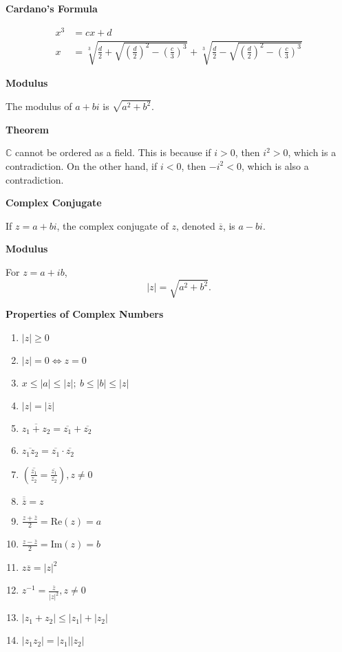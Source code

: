 \documentclass{article}
\newcommand{\inv}{^{-1}}
\newcommand{\C}{\mathbb C}
\begin{document}
\pagecolor{black}
\color{white}

\noindent\textbf{Cardano's Formula}

    \begin{align*}
        x^3 &= cx + d \\
        x &= \sqrt[3]{\frac d2 + \sqrt{\left(\frac d2\right)^2 - \left(\frac c3\right)^3}} + \sqrt[3]{\frac d2 - \sqrt{\left(\frac d2\right)^2 - \left(\frac c3\right)^3}}
    \end{align*}

\medskip\noindent\textbf{Modulus}

	The modulus of $a+bi$ is $\sqrt{a^2+b^2}$.

\medskip\noindent\textbf{Theorem}

	$\C$ cannot be ordered as a field. This is because if $i > 0$, then $i^2 > 0$, which is a contradiction. On the other hand, if $i < 0$, then $-i^2 < 0$, which is also a contradiction.

\medskip\noindent\textbf{Complex Conjugate}

    If $z = a+bi$, the complex conjugate of $z$, denoted $\overline z$, is $a-bi$.

\medskip\noindent\textbf{Modulus}

    For $z = a + ib$, $$|z| = \sqrt{a^2+b^2}.$$

\medskip\noindent\textbf{Properties of Complex Numbers}
    \begin{enumerate}
        \item $|z| \geq 0$
        \item $|z|=0 \iff z=0$
        \item $x \leq |a| \leq |z|; ~ b \leq |b| \leq |z|$
        \item $|z| = |\overline z|$
        \item $\overline{z_1 + z_2} = \overline{z_1} + \overline{z_2}$
        \item $\overline{z_1z_2} = \overline{z_1}\cdot\overline{z_2}$
        \item $\left( \overline{\frac{z_1}{z_2}} = \frac{\overline{z_1}}{\overline{z_2}} \right), z \neq 0$
        \item $\overline{\overline z} = z$
        \item $\frac{z + \overline z}2 = \text{Re}(z) = a$
        \item $\frac{z - \overline z}2 = \text{Im}(z) = b$
        \item $z \overline z = |z|^2$
        \item $z\inv = \frac{\overline z}{|z|^2}, z \neq 0$
        \item $|z_1 + z_2| \leq |z_1| + |z_2|$
        \item $|z_1z_2|=|z_1||z_2|$
    \end{enumerate}
\end{document}
